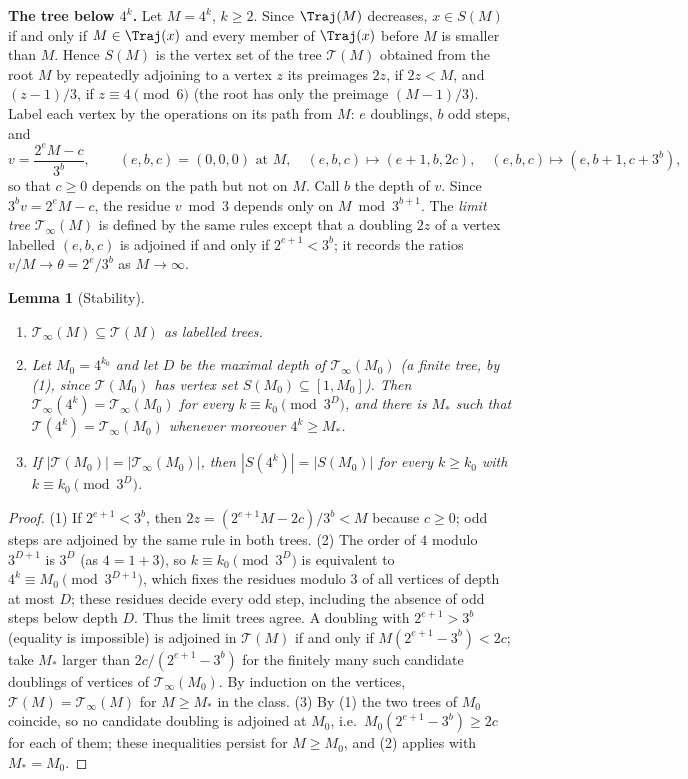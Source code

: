\documentclass[11pt,a4paper]{article}
\newtheorem{lemma}[theorem]{Lemma}
\theoremstyle{definition}
\theoremstyle{remark}
\numberwithin{equation}{section}
\begin{document}
\medskip\noindent\textbf{The tree below $4^k$.}
Let $M=4^k$, $k\ge2$. Since $\Traj(M)$ decreases, $x\in S(M)$ if and only if
$M\in\Traj(x)$ and every member of $\Traj(x)$ before $M$ is smaller than $M$.
Hence $S(M)$ is the vertex set of the tree $\mathcal T(M)$ obtained from the root
$M$ by repeatedly adjoining to a vertex $z$ its preimages $2z$, if $2z<M$, and
$(z-1)/3$, if $z\equiv4\pmod6$ (the root has only the preimage $(M-1)/3$). Label
each vertex by the operations on its path from $M$: $e$ doublings, $b$ odd steps,
and
\[
 v=\frac{2^eM-c}{3^b},\qquad (e,b,c)=(0,0,0)\text{ at }M,\quad
 (e,b,c)\mapsto(e+1,b,2c),\quad (e,b,c)\mapsto(e,b+1,c+3^b),
\]
so that $c\ge0$ depends on the path but not on $M$. Call $b$ the depth of $v$.
Since $3^bv=2^eM-c$, the residue $v\bmod3$ depends only on $M\bmod3^{b+1}$.
The \emph{limit tree} $\mathcal T_\infty(M)$ is defined by the same rules except
that a doubling $2z$ of a vertex labelled $(e,b,c)$ is adjoined if and only if
$2^{e+1}<3^b$; it records the ratios $v/M\to\theta=2^e/3^b$ as $M\to\infty$.

\begin{lemma}[Stability]\label{B:P:lem:stable}
\begin{enumerate}
\item $\mathcal T_\infty(M)\subseteq\mathcal T(M)$ as labelled trees.
\item Let $M_0=4^{k_0}$ and let $D$ be the maximal depth of $\mathcal T_\infty(M_0)$
(a finite tree, by (1), since $\mathcal T(M_0)$ has vertex set $S(M_0)\subseteq[1,M_0]$). Then $\mathcal T_\infty(4^k)=\mathcal T_\infty(M_0)$ for every
$k\equiv k_0\pmod{3^D}$, and there is $M_*$ such that $\mathcal T(4^k)=\mathcal
T_\infty(M_0)$ whenever moreover $4^k\ge M_*$.
\item If $|\mathcal T(M_0)|=|\mathcal T_\infty(M_0)|$, then
$|S(4^k)|=|S(M_0)|$ for every $k\ge k_0$ with $k\equiv k_0\pmod{3^D}$.
\end{enumerate}
\end{lemma}

\begin{proof}
(1) If $2^{e+1}<3^b$, then $2z=(2^{e+1}M-2c)/3^b<M$ because $c\ge0$; odd steps
are adjoined by the same rule in both trees.
(2) The order of $4$ modulo $3^{D+1}$ is $3^D$ (as $4=1+3$), so
$k\equiv k_0\pmod{3^D}$ is equivalent to $4^k\equiv M_0\pmod{3^{D+1}}$, which
fixes the residues modulo $3$ of all vertices of depth at most $D$; these
residues decide every odd step, including the absence of odd steps below depth
$D$. Thus the limit trees agree. A doubling with $2^{e+1}>3^b$ (equality is
impossible) is adjoined in $\mathcal T(M)$ if and only if
$M(2^{e+1}-3^b)<2c$; take $M_*$ larger than $2c/(2^{e+1}-3^b)$ for the finitely
many such candidate doublings of vertices of $\mathcal T_\infty(M_0)$. By
induction on the vertices, $\mathcal T(M)=\mathcal T_\infty(M)$ for $M\ge M_*$
in the class.
(3) By (1) the two trees of $M_0$ coincide, so no candidate doubling is adjoined
at $M_0$, i.e.\ $M_0(2^{e+1}-3^b)\ge2c$ for each of them; these inequalities
persist for $M\ge M_0$, and (2) applies with $M_*=M_0$.
\end{proof}
\end{document}
